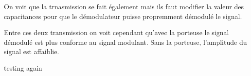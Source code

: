 \documentclass[11pt, openright]{book}
\begin{document}
On voit que la trnasmission se fait également mais ils faut modifier la valeur des capacitances pour que le démodulateur puisse propremment démodulé le signal.

Entre ces deux transmission on voit cependant qu'avec la porteuse le signal démodulé est plus conforme au signal modulant. Sans la porteuse, l'amplitude du signal est affaiblie.


testing again
\end{document}
